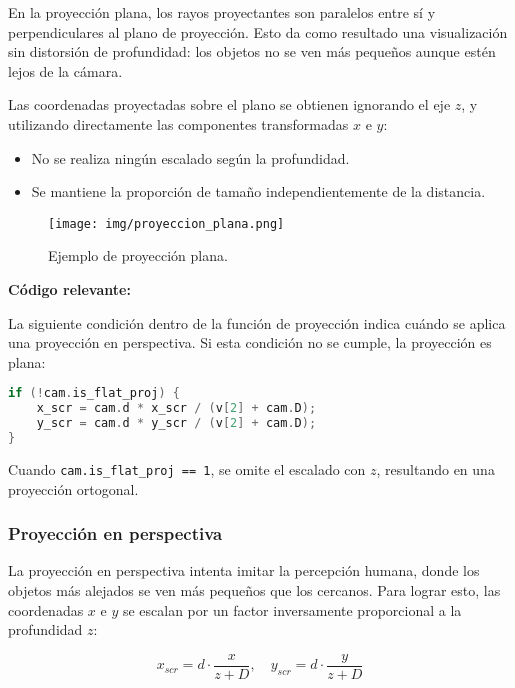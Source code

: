 \documentclass[12pt]{article}
\begin{document}
    En la proyección plana, los rayos proyectantes son paralelos entre sí y perpendiculares al plano de proyección. Esto da como resultado una visualización sin distorsión de profundidad: los objetos no se ven más pequeños aunque estén lejos de la cámara.

    Las coordenadas proyectadas sobre el plano se obtienen ignorando el eje \( z \), y utilizando directamente las componentes transformadas \( x \) e \( y \):

    \begin{itemize}
        \item No se realiza ningún escalado según la profundidad.
        \item Se mantiene la proporción de tamaño independientemente de la distancia.
    \end{itemize}

    \begin{figure}[H]
        \centering
        \texttt{[image: img/proyeccion\_plana.png]}
        \caption{Ejemplo de proyección plana.}
    \end{figure}

    \textbf{Código relevante:}

    La siguiente condición dentro de la función de proyección indica cuándo se aplica una proyección en perspectiva. Si esta condición no se cumple, la proyección es plana:

    \begin{lstlisting}[language=C, caption={Condición para aplicar proyección en perspectiva}]
if (!cam.is_flat_proj) {
    x_scr = cam.d * x_scr / (v[2] + cam.D);
    y_scr = cam.d * y_scr / (v[2] + cam.D);
}
    \end{lstlisting}

    Cuando \texttt{cam.is\_flat\_proj == 1}, se omite el escalado con \( z \), resultando en una proyección ortogonal.

    \subsubsection{Proyección en perspectiva}

    La proyección en perspectiva intenta imitar la percepción humana, donde los objetos más alejados se ven más pequeños que los cercanos. Para lograr esto, las coordenadas \( x \) e \( y \) se escalan por un factor inversamente proporcional a la profundidad \( z \):

    \[
        x_{scr} = d \cdot \frac{x}{z + D}, \quad
        y_{scr} = d \cdot \frac{y}{z + D}
    \]
\end{document}
